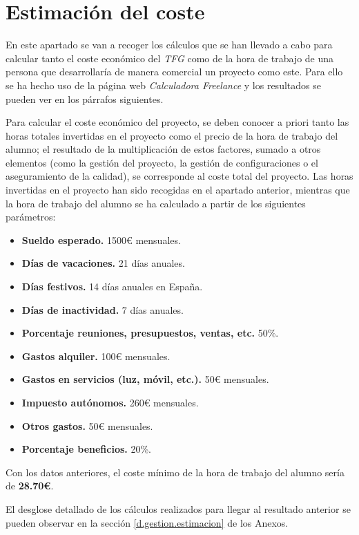\section{Estimación del coste} \label{gestion.estimacion}

En este apartado se van a recoger los cálculos que se han llevado a cabo para calcular tanto el coste económico del \textit{TFG} como de la hora de trabajo de una persona que desarrollaría de manera comercial un proyecto como este. Para ello se ha hecho uso de la página web \textit{Calculadora Freelance} \cite{calculadorafreelance} y los resultados se pueden ver en los párrafos siguientes. 
\par 
Para calcular el coste económico del proyecto, se deben conocer a priori tanto las horas totales invertidas en el proyecto como el precio de la hora de trabajo del alumno; el resultado de la multiplicación de estos factores, sumado a otros elementos (como la gestión del proyecto, la gestión de configuraciones o el aseguramiento de la calidad), se corresponde al coste total del proyecto. Las horas invertidas en el proyecto han sido recogidas en el apartado anterior, mientras que la hora de trabajo del alumno se ha calculado a partir de los siguientes parámetros: 

\begin{itemize}
\item \textbf{Sueldo esperado.} 1500€ mensuales. 
\item \textbf{Días de vacaciones.} 21 días anuales. 
\item \textbf{Días festivos.} 14 días anuales en España.
\item \textbf{Días de inactividad.} 7 días anuales. 
\item \textbf{Porcentaje reuniones, presupuestos, ventas, etc.} 50\%.
\item \textbf{Gastos alquiler.} 100€ mensuales. 
\item \textbf{Gastos en servicios (luz, móvil, etc.).} 50€ mensuales.
\item \textbf{Impuesto autónomos.} 260€ mensuales. 
\item \textbf{Otros gastos.} 50€ mensuales.
\item \textbf{Porcentaje beneficios.} 20\%.
\end{itemize}

Con los datos anteriores, el coste mínimo de la hora de trabajo del alumno sería de \textbf{28.70€}.

El desglose detallado de los cálculos realizados para llegar al resultado anterior se pueden observar en la sección \ref{d.gestion.estimacion} de los Anexos.

